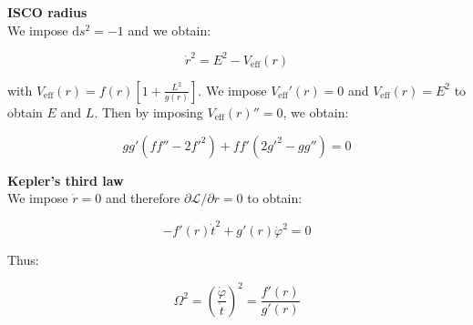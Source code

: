 \documentclass{beamer}
\newcommand{\paren}[1]{\left( #1 \right)}
\newcommand{\bracket}[1]{\left[ #1 \right]}
\newcommand{\mrm}{\mathrm}
\newcommand{\mscr}{\mathscr}
\begin{document}
    \begin{frame}[noframenumbering]
        \textbf{ISCO radius}\\
        We impose $\mrm ds^2 = -1$ and we obtain:
        
        \begin{equation}
            \dot r^2 = E^2 - V_\mrm{eff}(r)
        \end{equation}

        with $V_\mrm{eff}(r) = f(r)\bracket{1 + \frac{L^2}{g(r)}}$. We impose $V_\mrm{eff}'(r) = 0$ and $V_\mrm{eff}(r) = E^2$ to obtain $E$ and $L$. Then by imposing $V_\mrm{eff}(r)'' = 0$, we obtain:

        \begin{equation}
            gg'(ff'' - 2f'^2) + ff'(2g'^2 - gg'') = 0
        \end{equation}
    \end{frame}

\begin{frame}[noframenumbering]
    \textbf{Kepler's third law}\\
    We impose $\dot r = 0$ and therefore $\partial\mscr L / \partial r = 0$ to obtain:

    \begin{equation}
        -f'(r)\dot t^2 + g'(r)\dot \varphi^2 = 0
    \end{equation}

    Thus:

    \begin{equation}
        \Omega^2 = \paren{\frac{\dot \varphi}{\dot t}}^2 = \frac{f'(r)}{g'(r)}
    \end{equation}
\end{frame}
\end{document}
